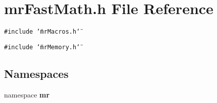 \section{mr\-Fast\-Math.h File Reference}
\label{mrFastMath_8h}
{\tt \#include \char`\"{}mr\-Macros.h\char`\"{}}\par
{\tt \#include \char`\"{}mr\-Memory.h\char`\"{}}\par
\subsection*{Namespaces}
\begin{CompactItemize}
\item 
namespace {\bf mr}
\end{CompactItemize}
